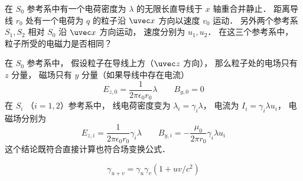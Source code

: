 
\begin{issues}
\issueDraft
\end{issues}


在 $S_0$ 参考系中有一个电荷密度为 $\lambda$ 的无限长直导线于 $x$ 轴重合并静止． 距离导线 $r_0$ 处有一个电荷为 $q$ 的粒子沿 $\uvec x$ 方向以速度 $v_0$ 运动． 另外两个参考系 $S_1, S_2$ 相对 $S_0$ 沿 $\uvec x$ 方向运动， 速度分别为 $u_1, u_2$． 在这三个参考系中， 粒子所受的电磁力是否相同？

在 $S_0$ 参考系中， 假设粒子在导线上方（$\uvec z$ 方向）， 那么粒子处的电场只有 $z$ 分量， 磁场只有 $y$ 分量（如果导线中存在电流）
\begin{equation}
E_{z,0} = \frac{1}{2\pi\epsilon_0 r_0} \lambda
\qquad
B_{y,0} = 0
\end{equation}
在 $S_i$ （$i=1,2$）参考系中， 线电荷密度变为 $\lambda_i = \gamma_i \lambda$， 电流为 $I_i = \gamma_i \lambda u_i$， 电磁场分别为
\begin{equation}
E_{z,i} = \frac{1}{2\pi\epsilon_0 r_0} \gamma_i \lambda
\qquad
B_{y,i} = -\frac{\mu_0}{2\pi r_0}\gamma_i \lambda u_i
\end{equation}
这个结论既符合直接计算也符合场变换公式．

\begin{equation}
\gamma_{u+v} = \gamma_u\gamma_v(1 + uv/c^2)
\end{equation}
